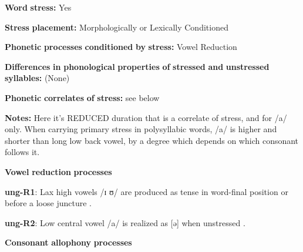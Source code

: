 \begin{styleBody}
\textbf{Word} \textbf{stress:} Yes
\end{styleBody}

\begin{styleBody}
\textbf{Stress} \textbf{placement:} Morphologically or Lexically Conditioned
\end{styleBody}

\begin{styleBody}
\textbf{Phonetic} \textbf{processes} \textbf{conditioned} \textbf{by} \textbf{stress:} Vowel Reduction
\end{styleBody}

\begin{styleBody}
\textbf{Differences} \textbf{in} \textbf{phonological} \textbf{properties} \textbf{of} \textbf{stressed} \textbf{and} \textbf{unstressed} \textbf{syllables:} (None)
\end{styleBody}

\begin{styleBody}
\textbf{Phonetic} \textbf{correlates} \textbf{of} \textbf{stress:} see below
\end{styleBody}

\begin{styleBody}
\textbf{Notes:} Here it’s REDUCED duration that is a correlate of stress, and for /a/ only. When carrying primary stress in polysyllabic words, /a/ is higher and shorter than long low back vowel, by a degree which depends on which consonant follows it.
\end{styleBody}

\begin{styleBody}
\textbf{Vowel} \textbf{reduction} \textbf{processes}
\end{styleBody}

\begin{styleBody}
\textbf{ung-R1}: Lax high vowels /ɪ ʊ/ are produced as tense in word-final position or before a loose juncture \citep[13-16]{Rumsey1978}.
\end{styleBody}

\begin{styleBody}
\textbf{ung-R2}: Low central vowel /a/ is realized as [ə] when unstressed \citep[17-18]{Rumsey1978}.
\end{styleBody}

\begin{styleBody}
\textbf{Consonant} \textbf{allophony} \textbf{processes}
\end{styleBody}

